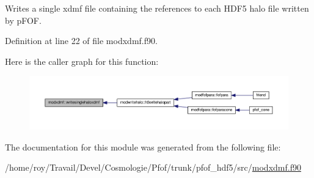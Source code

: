 Writes a single xdmf file containing the references to each H\-D\-F5 halo file written by p\-F\-O\-F. 



Definition at line 22 of file modxdmf.\-f90.



Here is the caller graph for this function\-:\nopagebreak
\begin{figure}[H]
\begin{center}
\leavevmode
\includegraphics[width=350pt]{classmodxdmf_ab794d1f6abf632c9ff4279bec51e13b1_icgraph}
\end{center}
\end{figure}




The documentation for this module was generated from the following file\-:\begin{DoxyCompactItemize}
\item 
/home/roy/\-Travail/\-Devel/\-Cosmologie/\-Pfof/trunk/pfof\-\_\-hdf5/src/\hyperlink{pfof__hdf5_2src_2modxdmf_8f90}{modxdmf.\-f90}\end{DoxyCompactItemize}
